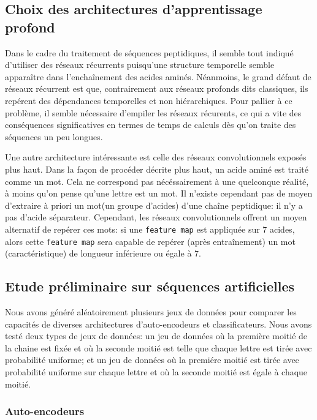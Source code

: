 \documentclass[a4paper,11pt]{article}
\begin{document}
\subsection{Choix des architectures d'apprentissage profond}

Dans le cadre du traitement de séquences peptidiques, il semble tout indiqué
d'utiliser des réseaux récurrents puisqu'une structure temporelle semble
apparaître dans l'enchaînement des acides aminés. Néanmoins, le grand défaut de
réseaux récurrent est que, contrairement aux réseaux profonds dits \og
classiques\fg, ils repérent des dépendances temporelles et non hiérarchiques.
Pour pallier à ce problème, il semble nécessaire d'empiler les réseaux
récurents, ce qui a vite des conséquences significatives en termes de temps de
calculs dès qu'on traite des séquences un peu longues.

Une autre architecture intéressante est celle des réseaux convolutionnels
exposés plus haut. Dans la façon de procéder décrite plus haut, un acide aminé
est traité comme un \og mot\fg. Cela ne correspond pas nécéssairement à une
quelconque réalité, à moins qu'on pense qu'une lettre est un mot. Il n'existe
cependant pas de moyen d'extraire à priori un \og mot\fg (un groupe d'acides)
d'une chaîne peptidique: il n'y a pas d'acide \og séparateur\fg. Cependant, les
réseaux convolutionnels offrent un moyen alternatif de repérer ces mots: si une
\texttt{feature map} est appliquée sur 7 acides, alors cette \texttt{feature
  map} sera capable de repérer (après entraînement) un mot (caractéristique) de
longueur inférieure ou égale à 7.

\subsection{Etude préliminaire sur séquences artificielles}

Nous avons généré aléatoirement plusieurs jeux de données pour comparer les
capacités de diverses architectures d'auto-encodeurs et classificateurs. Nous
avons testé deux types de jeux de données: un jeu de données où la première
moitié de la chaine est fixée et où la seconde moitié est telle que chaque
lettre est tirée avec probabilité uniforme; et un jeu de données où la premiére
moitié est tirée avec probabilité uniforme sur chaque lettre et où la seconde
moitié est égale à chaque moitié.

\subsubsection{Auto-encodeurs}
\end{document}
